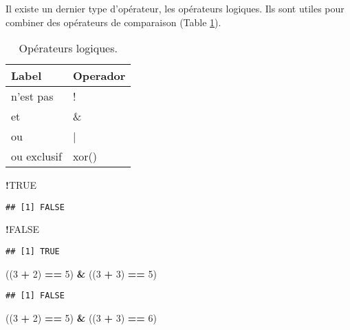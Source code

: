 \documentclass[]{book}
\newenvironment{Shaded}{\begin{snugshade}}{\end{snugshade}}
\newcommand{\DecValTok}[1]{\textcolor[rgb]{0.00,0.00,0.81}{#1}}
\newcommand{\StringTok}[1]{\textcolor[rgb]{0.31,0.60,0.02}{#1}}
\newcommand{\OtherTok}[1]{\textcolor[rgb]{0.56,0.35,0.01}{#1}}
\newcommand{\OperatorTok}[1]{\textcolor[rgb]{0.81,0.36,0.00}{\textbf{#1}}}
\newcommand{\NormalTok}[1]{#1}
\theoremstyle{definition}
\theoremstyle{definition}
\theoremstyle{definition}
\theoremstyle{remark}
\begin{document}
Il existe un dernier type d'opérateur, les opérateurs logiques. Ils sont
utiles pour combiner des opérateurs de comparaison (Table
\ref{tab:tabOpLog}).

\begin{table}

\caption{\label{tab:tabOpLog}Opérateurs logiques.\label{tab:tabOpLog}}
\centering
\begin{tabular}[t]{l|l}
\hline
Label & Operador\\
\hline
n'est pas & !\\
\hline
et & \&\\
\hline
ou & |\\
\hline
ou exclusif & xor()\\
\hline
\end{tabular}
\end{table}

\begin{Shaded}
\begin{Highlighting}[]
\OperatorTok{!}\OtherTok{TRUE}
\end{Highlighting}
\end{Shaded}

\begin{verbatim}
## [1] FALSE
\end{verbatim}

\begin{Shaded}
\begin{Highlighting}[]
\OperatorTok{!}\OtherTok{FALSE}
\end{Highlighting}
\end{Shaded}

\begin{verbatim}
## [1] TRUE
\end{verbatim}

\begin{Shaded}
\begin{Highlighting}[]
\NormalTok{((}\DecValTok{3} \OperatorTok{+}\StringTok{ }\DecValTok{2}\NormalTok{) }\OperatorTok{==}\StringTok{ }\DecValTok{5}\NormalTok{) }\OperatorTok{&}\StringTok{ }\NormalTok{((}\DecValTok{3} \OperatorTok{+}\StringTok{ }\DecValTok{3}\NormalTok{) }\OperatorTok{==}\StringTok{ }\DecValTok{5}\NormalTok{)}
\end{Highlighting}
\end{Shaded}

\begin{verbatim}
## [1] FALSE
\end{verbatim}

\begin{Shaded}
\begin{Highlighting}[]
\NormalTok{((}\DecValTok{3} \OperatorTok{+}\StringTok{ }\DecValTok{2}\NormalTok{) }\OperatorTok{==}\StringTok{ }\DecValTok{5}\NormalTok{) }\OperatorTok{&}\StringTok{ }\NormalTok{((}\DecValTok{3} \OperatorTok{+}\StringTok{ }\DecValTok{3}\NormalTok{) }\OperatorTok{==}\StringTok{ }\DecValTok{6}\NormalTok{)}
\end{Highlighting}
\end{Shaded}
\end{document}

